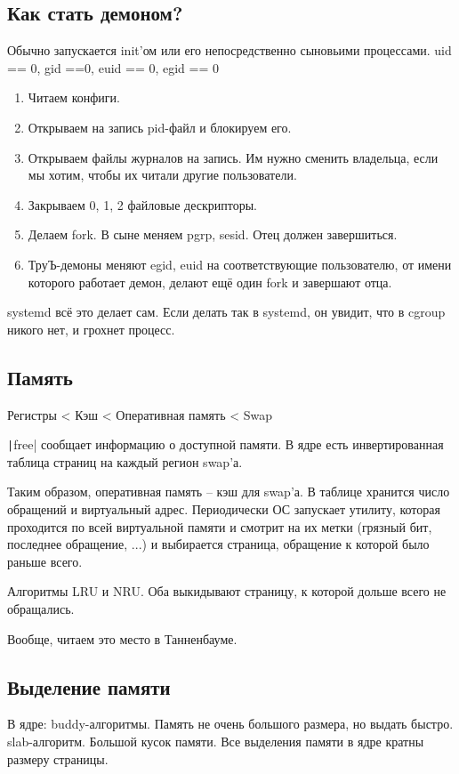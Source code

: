 \documentclass[a4paper,10pt]{article}
\begin{document}
\subsection{Как стать демоном?}
Обычно запускается init'ом или его непосредственно сыновьими процессами. 
uid == 0, gid ==0, euid == 0, egid == 0

\begin{enumerate}
 \item Читаем конфиги.
 \item Открываем на запись pid-файл и блокируем его.
 \item Открываем файлы журналов на запись. Им нужно сменить владельца, если мы хотим, чтобы их читали другие пользователи.
 \item Закрываем 0, 1, 2 файловые дескрипторы.
 \item Делаем fork. В сыне меняем pgrp, sesid. Отец должен завершиться.
 \item ТруЪ-демоны меняют egid, euid на соответствующие пользователю, от имени которого работает демон, делают ещё один fork и завершают отца.
\end{enumerate}
systemd всё это делает сам. Если делать так в systemd, он увидит, что в cgroup никого нет, и грохнет процесс.

\subsection{Память}
Регистры < Кэш < Оперативная память < Swap

\texttt|free| сообщает информацию о доступной памяти. В ядре есть инвертированная таблица страниц на каждый регион swap'а.

Таким образом, оперативная память -- кэш для swap'а. В таблице хранится число обращений и виртуальный адрес.
Периодически ОС запускает утилиту, которая проходится по всей виртуальной памяти и смотрит на их метки (грязный бит, последнее обращение, ...) и выбирается страница, обращение к которой было раньше всего.

Алгоритмы LRU и NRU. Оба выкидывают страницу, к которой дольше всего не обращались.

Вообще, читаем это место в Танненбауме.

\subsection{Выделение памяти}

В ядре:
buddy-алгоритмы. Память не очень большого размера, но выдать быстро.
slab-алгоритм. Большой кусок памяти.
Все выделения памяти в ядре кратны размеру страницы.
\end{document}
